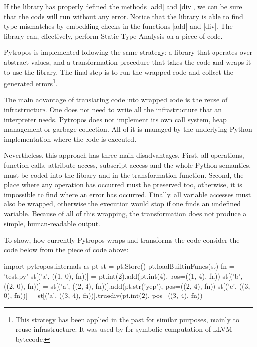 If the library has properly defined the methods \pycode|add| and
\pycode|div|, we can be sure that the code will run without any error.
Notice that the library is able to find type mismatches by embedding
checks in the functions \pycode|add| and \pycode|div|. The library can,
effectively, perform Static Type Analysis on a piece of code.

Pytropos is implemented following the same strategy: a library that
operates over abstract values, and a transformation procedure that takes
the code and wraps it to use the library. The final step is to run the
wrapped code and collect the generated errors\footnote{%
  This strategy has been applied in the past for similar purposes, mainly to reuse
  infrastructure. It was used by \textcite{lauko_symbolic_2018} for symbolic computation
  of LLVM bytecode.
  }.

The main advantage of translating code into wrapped code is the reuse of
infrastructure. One does not need to write all the infrastructure that
an interpreter needs. Pytropos does not implement its own call system,
heap management or garbage collection. All of it is managed by the
underlying Python implementation where the code is executed.

Nevertheless, this approach has three main disadvantages. First, all operations, function
calls, attribute access, subscript access and the whole Python semantics, must be coded
into the library and in the transformation function. Second, the place where any operation
has occurred must be preserved too, otherwise, it is impossible to find where an error has
occurred. Finally, all variable accesses must also be wrapped, otherwise the execution
would stop if one finds an undefined variable.  Because of all of this wrapping, the
transformation does not produce a simple, human-readable output.

To show, how currently Pytropos wraps and transforms the code consider the code below
from the piece of code above:

\begin{pythoncode}
import pytropos.internals as pt
st = pt.Store()
pt.loadBuiltinFuncs(st)
fn = 'test.py'
st[('a', ((1, 0), fn))] = pt.int(2).add(pt.int(4), pos=((1, 4), fn))
st[('b', ((2, 0), fn))] = st[('a', ((2, 4), fn))].add(pt.str('yep'), pos=((2, 4), fn))
st[('c', ((3, 0), fn))] = st[('a', ((3, 4), fn))].truediv(pt.int(2), pos=((3, 4), fn))
\end{pythoncode}

